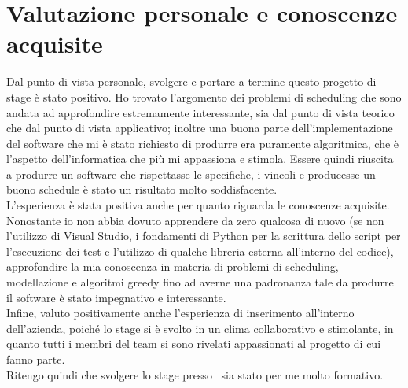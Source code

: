 \section{Valutazione personale e conoscenze acquisite}
Dal punto di vista personale, svolgere e portare a termine questo progetto di stage è stato positivo. Ho trovato l'argomento dei problemi di scheduling che sono andata ad approfondire estremamente interessante, sia dal punto di vista teorico che dal punto di vista applicativo; inoltre una buona parte dell'implementazione del software che mi è stato richiesto di produrre era puramente algoritmica, che è l'aspetto dell'informatica che più mi appassiona e stimola. Essere quindi riuscita a produrre un software che rispettasse le specifiche, i vincoli e producesse un buono schedule è stato un risultato molto soddisfacente.\\
L'esperienza è stata positiva anche per quanto riguarda le conoscenze acquisite. Nonostante io non abbia dovuto apprendere da zero qualcosa di nuovo (se non l'utilizzo di Visual Studio, i fondamenti di Python per la scrittura dello script per l'esecuzione dei test e l'utilizzo di qualche libreria esterna all'interno del codice), approfondire la mia conoscenza in materia di problemi di scheduling, modellazione e algoritmi greedy fino ad averne una padronanza tale da produrre il software è stato impegnativo e interessante. \\
Infine, valuto positivamente anche l'esperienza di inserimento all'interno dell'azienda, poiché lo stage si è svolto in un clima collaborativo e stimolante, in quanto tutti i membri del team si sono rivelati appassionati al progetto di cui fanno parte.\\ Ritengo quindi che svolgere lo stage presso \TS\ sia stato per me molto formativo.

